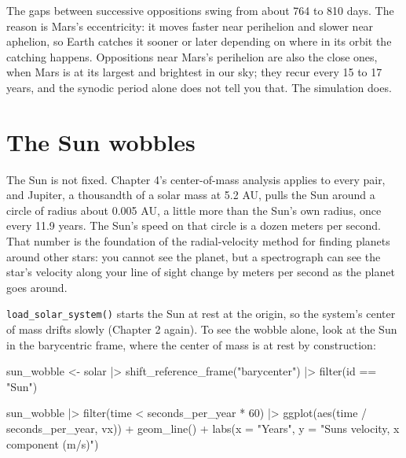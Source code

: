 \documentclass[
  10.5pt,
  letterpaper,
]{scrbook}
\newenvironment{Shaded}{\begin{snugshade}}{\end{snugshade}}
\newcommand{\AttributeTok}[1]{\textcolor[rgb]{0.00,0.00,0.00}{#1}}
\newcommand{\DecValTok}[1]{\textcolor[rgb]{0.00,0.00,0.00}{#1}}
\newcommand{\FunctionTok}[1]{\textcolor[rgb]{0.00,0.00,0.00}{#1}}
\newcommand{\NormalTok}[1]{\textcolor[rgb]{0.00,0.00,0.00}{#1}}
\newcommand{\OtherTok}[1]{\textcolor[rgb]{0.00,0.00,0.00}{#1}}
\newcommand{\SpecialCharTok}[1]{\textcolor[rgb]{0.00,0.00,0.00}{#1}}
\newcommand{\StringTok}[1]{\textcolor[rgb]{0.00,0.00,0.00}{#1}}
\theoremstyle{plain}
\theoremstyle{remark}
\begin{document}
The gaps between successive oppositions swing from about 764 to 810
days. The reason is Mars's eccentricity: it moves faster near perihelion
and slower near aphelion, so Earth catches it sooner or later depending
on where in its orbit the catching happens. Oppositions near Mars's
perihelion are also the close ones, when Mars is at its largest and
brightest in our sky; they recur every 15 to 17 years, and the synodic
period alone does not tell you that. The simulation does.

\section{The Sun wobbles}\label{the-sun-wobbles}

The Sun is not fixed. Chapter 4's center-of-mass analysis applies to
every pair, and Jupiter, a thousandth of a solar mass at 5.2 AU, pulls
the Sun around a circle of radius about 0.005 AU, a little more than the
Sun's own radius, once every 11.9 years. The Sun's speed on that circle
is a dozen meters per second. That number is the foundation of the
radial-velocity method for finding planets around other stars: you
cannot see the planet, but a spectrograph can see the star's velocity
along your line of sight change by meters per second as the planet goes
around.

\texttt{load\_solar\_system()} starts the Sun at rest at the origin, so
the system's center of mass drifts slowly (Chapter 2 again). To see the
wobble alone, look at the Sun in the barycentric frame, where the center
of mass is at rest by construction:

\begin{Shaded}
\begin{Highlighting}[]
\NormalTok{sun\_wobble }\OtherTok{\textless{}{-}}\NormalTok{ solar }\SpecialCharTok{|\textgreater{}}
  \FunctionTok{shift\_reference\_frame}\NormalTok{(}\StringTok{"barycenter"}\NormalTok{) }\SpecialCharTok{|\textgreater{}}
  \FunctionTok{filter}\NormalTok{(id }\SpecialCharTok{==} \StringTok{"Sun"}\NormalTok{)}
\end{Highlighting}
\end{Shaded}

\begin{Shaded}
\begin{Highlighting}[]
\NormalTok{sun\_wobble }\SpecialCharTok{|\textgreater{}}
  \FunctionTok{filter}\NormalTok{(time }\SpecialCharTok{\textless{}}\NormalTok{ seconds\_per\_year }\SpecialCharTok{*} \DecValTok{60}\NormalTok{) }\SpecialCharTok{|\textgreater{}}
  \FunctionTok{ggplot}\NormalTok{(}\FunctionTok{aes}\NormalTok{(time }\SpecialCharTok{/}\NormalTok{ seconds\_per\_year, vx)) }\SpecialCharTok{+}
  \FunctionTok{geom\_line}\NormalTok{() }\SpecialCharTok{+}
  \FunctionTok{labs}\NormalTok{(}\AttributeTok{x =} \StringTok{"Years"}\NormalTok{, }\AttributeTok{y =} \StringTok{"Sun\textquotesingle{}s velocity, x component (m/s)"}\NormalTok{)}
\end{Highlighting}
\end{Shaded}
\end{document}
